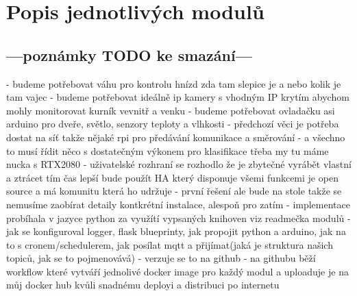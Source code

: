 \section{Popis jednotlivých modulů}\label{sec:popis-jednotlivych-modulu}

























\subsection{---poznámky TODO ke smazání---}\label{subsec:---poznamky-todo-ke-smazani---}
- budeme potřebovat váhu pro kontrolu hnízd zda tam slepice je a nebo kolik je tam vajec\newline
- budeme potřebovat ideálně ip kamery s vhodným IP krytím abychom mohly monitorovat kurník vevnitř a venku\newline
- budeme potřebovat ovladačku asi arduino pro dveře, světlo, senzory teploty a vlhkosti\newline
- předchozí věci je potřeba dostat na síť takže nějaké rpi pro předávání komunikace a směrování\newline
- a všechno to musí řídit něco s dostatečným výkonem pro klasifikace třeba my tu máme nucka s RTX2080\newline
- uživatelské rozhraní se rozhodlo že je zbytečné vyrábět vlastní a ztrácet tím čas lepší bude použít HA který disponuje všemi funkcemi je open source a má komunitu která ho udržuje
- první řešení ale bude na stole takže se nemusíme zaobírat detaily kontkrétní instalace, alespoň pro zatím
- implementace probíhala v jazyce python za využítí vypsaných knihoven viz readmečka modulů\newline
- jak se konfiguroval logger, flask blueprinty, jak propojit python a arduino, jak na to s cronem/schedulerem, jak posílat mqtt a přijímat(jaká je struktura našich topiců, jak se to pojmenovává)
- verzuje se to na github
- na githubu běží workflow které vytváří jednolivé docker image pro každý modul a uploaduje je na můj docker hub kvůli snadnému deployi a distribuci po internetu

